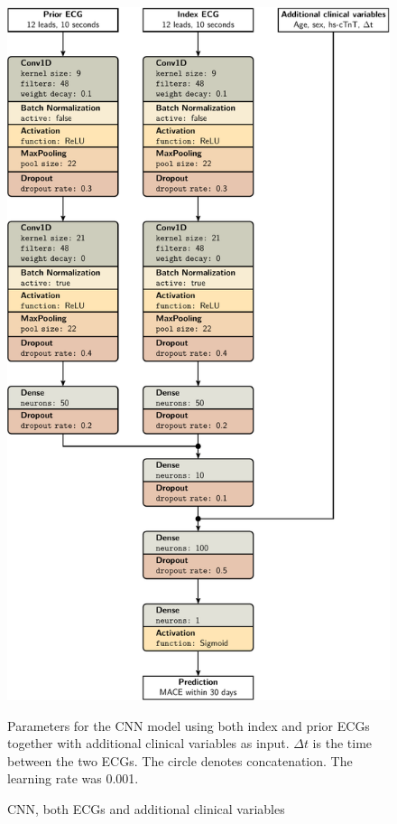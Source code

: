 \documentclass[preprint]{elsarticle}
\begin{document}
\begin{figure}[H]
\centering
\includegraphics[scale=\modelscale,keepaspectratio]{figures/model-cnn4.pdf}
\caption{CNN, both ECGs and additional clinical variables}
\medskip
\small
Parameters for the CNN model using both index and prior ECGs together with additional clinical variables as input. $\Delta t$ is the time between the two ECGs. The circle denotes concatenation. The learning rate was 0.001. 
\end{figure}
\end{document}
